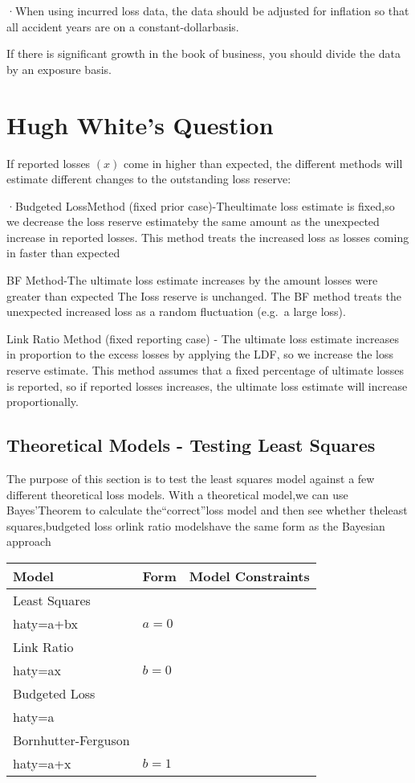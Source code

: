 \documentclass[
]{article}
\begin{document}
·When using incurred loss data, the data should be adjusted for
inflation so that all accident years are on a constant-dollarbasis.

If there is significant growth in the book of business, you should
divide the data by an exposure basis.

\section{Hugh White's Question}\label{hugh-whites-question}

If reported losses \((x)\) come in higher than expected, the different
methods will estimate different changes to the outstanding loss reserve:

·Budgeted LossMethod (fixed prior case)-Theultimate loss estimate is
fixed,so we decrease the loss reserve estimateby the same amount as the
unexpected increase in reported losses. This method treats the increased
loss as losses coming in faster than expected

BF Method-The ultimate loss estimate increases by the amount losses were
greater than expected The Ioss reserve is unchanged. The BF method
treats the unexpected increased loss as a random fluctuation (e.g.~a
large loss).

Link Ratio Method (fixed reporting case) - The ultimate loss estimate
increases in proportion to the excess losses by applying the LDF, so we
increase the loss reserve estimate. This method assumes that a fixed
percentage of ultimate losses is reported, so if reported losses
increases, the ultimate loss estimate will increase proportionally.

\subsection{Theoretical Models - Testing Least
Squares}\label{theoretical-models---testing-least-squares}

The purpose of this section is to test the least squares model against a
few different theoretical loss models. With a theoretical model,we can
use Bayes'Theorem to calculate the``correct''loss model and then see
whether theleast squares,budgeted loss orlink ratio modelshave the same
form as the Bayesian approach

\begin{longtable}[]{@{}lll@{}}
\toprule\noalign{}
Model & Form & Model Constraints \\
\midrule\noalign{}
\endhead
\bottomrule\noalign{}
\endlastfoot
Least Squares & \(\\hat{y}=a+bx\) & \(a=0\) \\
Link Ratio & \(\\hat{y}=ax\) & \(b=0\) \\
Budgeted Loss & \(\\hat{y}=a\) & \\
Bornhutter-Ferguson & \(\\hat{y}=a+x\) & \(b=1\) \\
\end{longtable}
\end{document}
